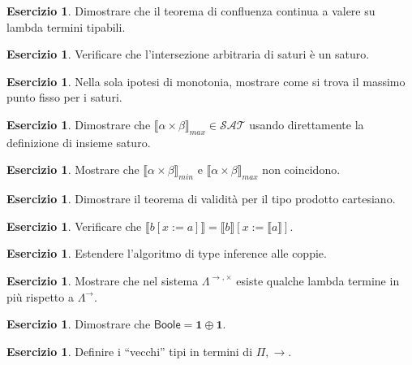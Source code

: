 \documentclass[oneside]{amsart}
\numberwithin{equation}{section}
\numberwithin{figure}{section}
\theoremstyle{plain}
\theoremstyle{definition}
\newtheorem{xca}[thm]{Esercizio}
\begin{document}
\begin{xca}
Dimostrare che il teorema di confluenza continua a valere su lambda termini tipabili.
\end{xca}

\begin{xca}
Verificare che l'intersezione arbitraria di saturi è un saturo.
\end{xca}

\begin{xca}
Nella sola ipotesi di monotonia, mostrare come si trova il massimo
punto fisso per i saturi.
\end{xca}

\begin{xca}
Dimostrare che $\llbracket\alpha\times\beta\rrbracket_{max} \in \mathcal{SAT}$
usando direttamente la definizione di insieme saturo.
\end{xca}

\begin{xca}
Mostrare che $\llbracket\alpha\times\beta\rrbracket_{min}$ e
$\llbracket\alpha\times\beta\rrbracket_{max}$ non coincidono.
\end{xca}

\begin{xca}
Dimostrare il teorema di validità per il tipo prodotto cartesiano.
\end{xca}

\begin{xca}
Verificare che $\llbracket b[x:=a] \rrbracket = \llbracket b\rrbracket[x:=\llbracket a\rrbracket]$.
\end{xca}

\begin{xca}
Estendere l'algoritmo di type inference alle coppie.
\end{xca}

\begin{xca}
Mostrare che nel sistema $\Lambda^{\rightarrow,\times}$ esiste qualche lambda termine
in più rispetto a $\Lambda^{\rightarrow}$.
\end{xca}

\begin{xca}
Dimostrare che $\mathsf{Boole} = \mathbf{1}\oplus\mathbf{1}$.
\end{xca}

\begin{xca}
Definire i ``vecchi'' tipi in termini di $\Pi,\rightarrow$.
\end{xca}
\end{document}

